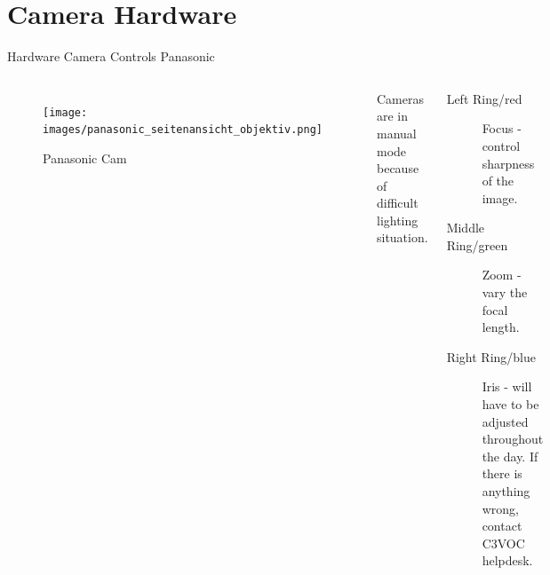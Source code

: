 \documentclass[aspectratio=169]{beamer}
\begin{document}
%


\section{Camera Hardware}
\begin{frame}{Hardware Camera Controls Panasonic}
	\begin{columns}[T,onlytextwidth]
	\begin{figure} 
		\centering
		\texttt{[image: images/panasonic\_seitenansicht\_objektiv.png]}
		\caption{Panasonic Cam}
	\end{figure}
		Cameras are in manual mode because of difficult lighting situation.
		\begin{description}
			\item[Left Ring/red] Focus - control sharpness of the image.
			\item[Middle Ring/green] Zoom - vary the focal length.
			\item[Right Ring/blue] Iris - will have to be adjusted throughout the day. If there is anything wrong, contact C3VOC helpdesk.
		\end{description}
	\end{columns}
\end{frame}
\end{document}
